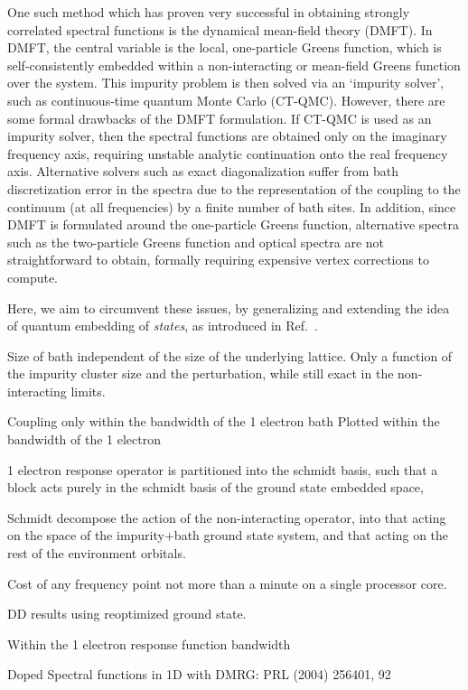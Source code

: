 \documentclass[aps,showpacs,twocolumn,nobibnotes]{revtex4}
\begin{document}
One such method which has proven very successful in obtaining strongly correlated spectral functions is the dynamical mean-field theory (DMFT). In DMFT, the central variable is the
local, one-particle Greens function, which is self-consistently embedded within a non-interacting or mean-field Greens function over the system. This impurity problem is then solved via
an `impurity solver', such as continuous-time quantum Monte Carlo (CT-QMC). However, there are some formal drawbacks of the DMFT formulation. If CT-QMC is used as an impurity solver, then
the spectral functions are obtained only on the imaginary frequency axis, requiring unstable analytic continuation onto the real frequency axis. Alternative solvers such as exact diagonalization
suffer from bath discretization error in the spectra due to the representation of the coupling to the continuum (at all frequencies) by a finite number of bath sites. In addition, since DMFT
is formulated around the one-particle Greens function, alternative spectra such as the two-particle Greens function and optical spectra are not straightforward to obtain, formally 
requiring expensive vertex corrections to compute\cite{Millis2012}.

Here, we aim to circumvent these issues, by generalizing and extending the idea of quantum embedding of {\em states}, as introduced in Ref.~. 

Size of bath independent of the size of the underlying lattice. Only a function of the impurity cluster size and the perturbation, while still exact in the non-interacting limits.

Coupling only within the bandwidth of the 1 electron bath
Plotted within the bandwidth of the 1 electron 

1 electron response operator is partitioned into the schmidt basis, such that a block acts purely in the schmidt basis of the ground state embedded space, 

Schmidt decompose the action of the non-interacting operator, into that acting on the space of the impurity+bath ground state system, and that acting on the rest of the environment orbitals.

Cost of any frequency point not more than a minute on a single processor core.

DD results using reoptimized ground state.

Within the 1 electron response function bandwidth

Doped Spectral functions in 1D with DMRG: PRL (2004) 256401, 92
\end{document}
